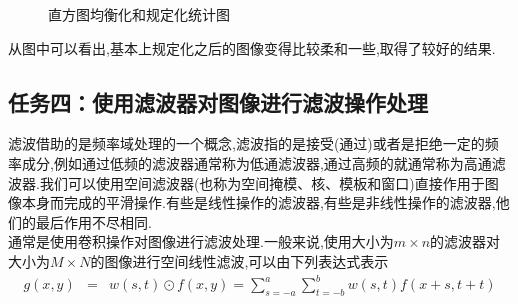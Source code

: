 \documentclass[UTF8,a4paper,10pt]{ctexart}
\begin{document}
\begin{flushleft}
\begin{figure}[htbp]
{\begin{minipage}[t]{0.5\linewidth}
                \end{minipage}%
            }%
            \quad
            \caption{直方图均衡化和规定化统计图}
            \label{fig:fig_gray_hist_regularation_cdf_before_after}
        \end{figure}
        \hspace{2em}从图中可以看出,基本上规定化之后的图像变得比较柔和一些,取得了较好的结果.
        \subsection{任务四：使用滤波器对图像进行滤波操作处理}
        \hspace{2em}滤波借助的是频率域处理的一个概念,滤波指的是接受(通过)或者是拒绝一定的频率成分,例如通过低频的滤波器通常称为低通滤波器,通过高频的就通常称为高通滤波器.我们可以使用空间滤波器(也称为空间掩模、核、模板和窗口)直接作用于图像本身而完成的平滑操作.有些是线性操作的滤波器,有些是非线性操作的滤波器,他们的最后作用不尽相同.\\
        \hspace{2em}通常是使用卷积操作对图像进行滤波处理.一般来说,使用大小为$m\times{n}$的滤波器对大小为$M\times{N}$的图像进行空间线性滤波,可以由下列表达式表示
        \begin{eqnarray}
            g(x,y)&=&w(s,t)\odot{f(x,y)}=\sum\limits_{s=-a}^{a}\sum\limits_{t=-b}^{b}w(s,t)f(x+s,t+t)\nonumber
        \end{eqnarray}

\end{flushleft}
\end{document}

